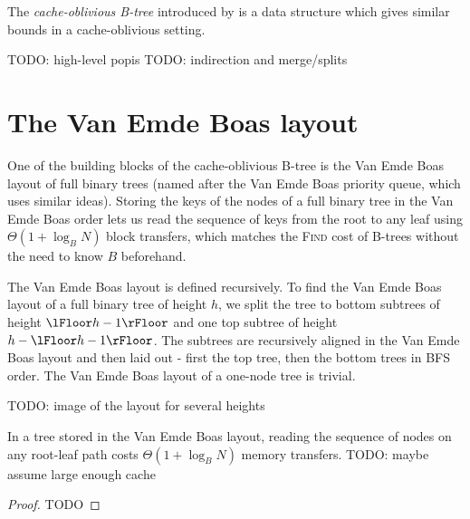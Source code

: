 The \textit{cache-oblivious B-tree} introduced by \cite{demaine00}
is a data structure which gives similar bounds in a cache-oblivious
setting.

TODO: high-level popis
TODO: indirection and merge/splits

\section{The Van Emde Boas layout}
One of the building blocks of the cache-oblivious B-tree is the Van Emde Boas
layout of full binary trees (named after the Van Emde Boas priority queue,
which uses similar ideas). Storing the keys of the nodes of a full binary tree
in the Van Emde Boas order lets us read the sequence of keys
from the root to any leaf using $\Theta(1+\log_B N)$ block transfers, which
matches the \textsc{Find} cost of B-trees without the need to know $B$ beforehand.

The Van Emde Boas layout is defined recursively. To find the Van Emde Boas layout
of a full binary tree of height $h$, we split the tree to bottom subtrees
of height $\lFloor h-1 \rFloor$ and one top subtree of height $h - \lFloor h-1 \rFloor$.
The subtrees are recursively aligned in the Van Emde Boas layout and then laid
out - first the top tree, then the bottom trees in BFS order. The Van Emde Boas
layout of a one-node tree is trivial.

TODO: image of the layout for several heights

\begin{theorem}
In a tree stored in the Van Emde Boas layout, reading the sequence of nodes
on any root-leaf path costs $\Theta(1+\log_B N)$ memory transfers.
TODO: maybe assume large enough cache
\end{theorem}

\begin{proof}
TODO
\end{proof}
